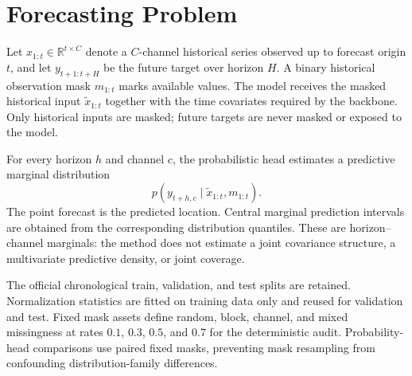\section{Forecasting Problem}
\label{sec:forecasting-problem}

Let $x_{1:t}\in\mathbb{R}^{t\times C}$ denote a $C$-channel historical series observed up to forecast origin $t$, and let $y_{t+1:t+H}$ be the future target over horizon $H$. A binary historical observation mask $m_{1:t}$ marks available values. The model receives the masked historical input $\widetilde{x}_{1:t}$ together with the time covariates required by the backbone. Only historical inputs are masked; future targets are never masked or exposed to the model.

For every horizon $h$ and channel $c$, the probabilistic head estimates a predictive marginal distribution
\begin{equation}
p(y_{t+h,c}\mid\widetilde{x}_{1:t},m_{1:t}).
\label{eq:marginal-forecast}
\end{equation}
The point forecast is the predicted location. Central marginal prediction intervals are obtained from the corresponding distribution quantiles. These are horizon--channel marginals: the method does not estimate a joint covariance structure, a multivariate predictive density, or joint coverage.

The official chronological train, validation, and test splits are retained. Normalization statistics are fitted on training data only and reused for validation and test. Fixed mask assets define random, block, channel, and mixed missingness at rates $0.1$, $0.3$, $0.5$, and $0.7$ for the deterministic audit. Probability-head comparisons use paired fixed masks, preventing mask resampling from confounding distribution-family differences.
